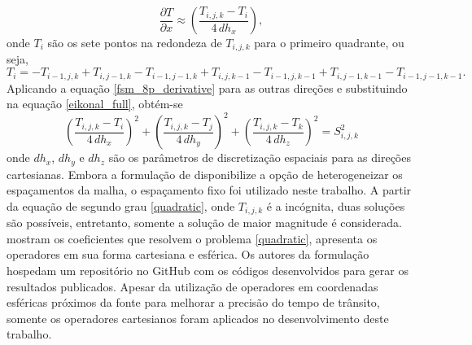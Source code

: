 \begin{equation}
	\dfrac{\partial T}{\partial x} \approx \left(\dfrac{T_{i,j,k} - T_i}{4\, dh_x}\right),
	\label{fsm_8p_derivative}
\end{equation}
\noindent onde $T_i$ são os sete pontos na redondeza de $T_{i,j,k}$ para o primeiro quadrante, ou seja,
\begin{equation}
	T_i = - T_{i-1,j,k} + T_{i,j-1,k} - T_{i-1,j-1,k} + T_{i,j,k-1} - T_{i-1,j,k-1} + T_{i,j-1,k-1} - T_{i-1,j-1,k-1}.
\end{equation} 
\noindent Aplicando a equação \ref{fsm_8p_derivative} para as outras direções e substituindo na equação \ref{eikonal_full}, obtém-se
\begin{equation}
	\left(\dfrac{T_{i,j,k} - T_i}{4\,dh_x}\right)^2 + \left(\dfrac{T_{i,j,k} - T_j}{4\,dh_y}\right)^2 + \left(\dfrac{T_{i,j,k} - T_k}{4\,dh_z}\right)^2 = S^2_{i,j,k}
	\label{quadratic}
\end{equation}
\noindent onde $dh_x$, $dh_y$ e $dh_z$ são os parâmetros de discretização espaciais para as direções cartesianas. Embora a formulação de  disponibilize a opção de heterogeneizar os espaçamentos da malha, o espaçamento fixo foi utilizado neste trabalho. A partir da equação de segundo grau \ref{quadratic}, onde $T_{i,j,k}$ é a incógnita, duas soluções são possíveis, entretanto, somente a solução de maior magnitude é considerada.  mostram os coeficientes que resolvem o problema \ref{quadratic}, apresenta os operadores em sua forma cartesiana e esférica. Os autores da formulação hospedam um repositório no GitHub com os códigos desenvolvidos para gerar os resultados publicados. Apesar da utilização de operadores em coordenadas esféricas próximos da fonte para melhorar a precisão do tempo de trânsito, somente os operadores cartesianos foram aplicados no desenvolvimento deste trabalho.        

